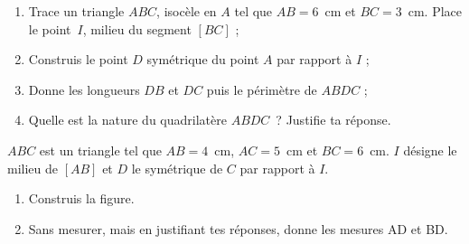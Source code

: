 \begin{exercice}
\begin{enumerate}
 \item Trace un triangle $ABC$, isocèle en $A$ tel que $AB = 6$ cm et $BC = 3$ cm. Place le point $I$, milieu du segment $[BC]$ ;
 \item Construis le point $D$ symétrique du point $A$ par rapport à $I$ ;
 \item Donne les longueurs $DB$ et $DC$ puis le périmètre de $ABDC$ ;
 \item Quelle est la nature du quadrilatère $ABDC$ ? Justifie ta réponse.
 \end{enumerate}
\end{exercice}


\begin{exercice}
$ABC$ est un triangle tel que $AB = 4$ cm, $AC = 5$ cm et $BC = 6$ cm. $I$ désigne le milieu de $[AB]$ et $D$ le symétrique de $C$ par rapport à $I$.
\begin{enumerate}
 \item Construis la figure.
 \item Sans mesurer, mais en justifiant tes réponses, donne les mesures AD et BD.
 \end{enumerate}
\end{exercice}